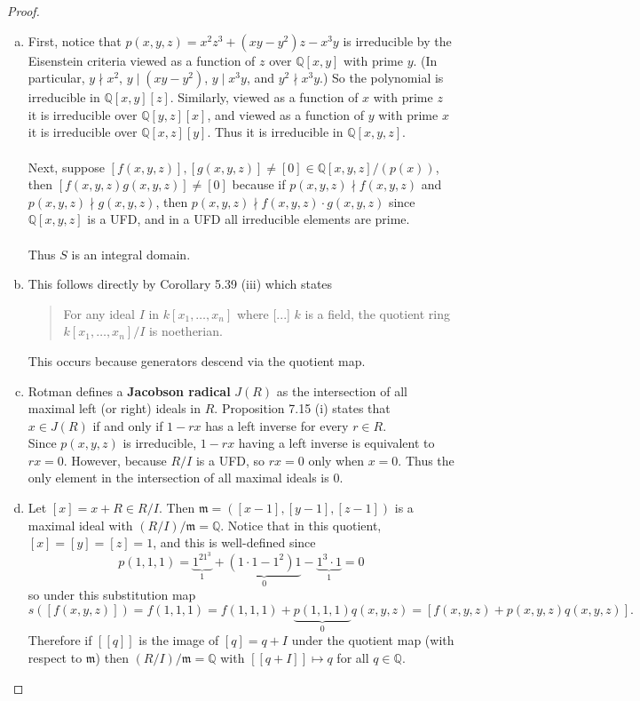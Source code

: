 \documentclass{article}
\begin{document}
\begin{proof} ~
  \begin{enumerate}[(a)]
    \item First, notice that $p(x,y,z) = x^2z^3 + (xy - y^2)z - x^3y$ is
    irreducible by the Eisenstein criteria viewed as a function of $z$ over
    $\mathbb Q[x,y]$ with prime $y$. (In particular, $y \nmid x^2$,
    $y \mid (xy - y^2)$, $y \mid x^3y$, and $y^2 \nmid x^3y$.) So the polynomial is
    irreducible in $\mathbb Q[x,y][z]$.
    Similarly, viewed as a function of $x$ with prime $z$ it is irreducible
    over $\mathbb Q[y,z][x]$, and viewed as a function of $y$ with prime $x$ it
    is irreducible over $\mathbb Q[x,z][y]$.
    Thus it is irreducible in $\mathbb Q[x,y,z]$.
    \\~\\
    Next, suppose $[f(x,y,z)], [g(x,y,z)] \neq [0] \in \mathbb Q[x,y,z]/(p(x))$, then
    $[f(x,y,z)g(x,y,z)] \neq [0]$ because if $p(x,y,z) \nmid f(x,y,z)$ and
    $p(x,y,z) \nmid g(x,y,z)$, then $p(x,y,z) \nmid f(x,y,z)\cdot g(x,y,z)$
    since $\mathbb Q[x,y,z]$ is a UFD, and in a UFD all irreducible elements are prime.
    \\~\\
    Thus $S$ is an integral domain.
    \item This follows directly by Corollary 5.39 (iii) which states
      \begin{quote}
        For any ideal $I$ in $k[x_1, \hdots, x_n]$ where [...] $k$ is a field,
        the quotient ring $k[x_1, \hdots, x_n]/I$ is noetherian.
      \end{quote}
    This occurs because generators descend via the quotient map.
    \item Rotman defines a \textbf{Jacobson radical} $J(R)$ as the intersection
    of all maximal left (or right) ideals in $R$. Proposition 7.15 (i) states
    that $x \in J(R)$ if and only if $1 - rx$ has a left inverse for every
    $r \in R$.
    \\
    Since $p(x,y,z)$ is irreducible, $1 - rx$ having a left inverse is
    equivalent to $rx = 0$. However, because $R/I$ is a UFD, so $rx = 0$ only
    when $x = 0$. Thus the only element in the intersection of all maximal
    ideals is $0$.
    \item Let $[x] = x + R \in R/I$. Then $
      \mathfrak m = ([x - 1], [y - 1], [z - 1])
    $ is a maximal ideal with $(R/I)/\mathfrak m = \mathbb Q$.
    Notice that in this quotient, $[x] = [y] = [z] = 1$,
    and this is well-defined since \[
      p(1,1,1) =
      \underbrace{1^21^3}_1
      + \underbrace{(1\cdot 1 - 1^2)1}_0
      - \underbrace{1^3\cdot1}_1 = 0
    \] so under this substitution map \[
      s([f(x,y,z)])
      = f(1,1,1)
      = f(1,1,1) + \underbrace{p(1,1,1)}_0 q(x,y,z)
      = [f(x,y,z) + p(x,y,z)q(x,y,z)].
    \]
    Therefore if $[[q]]$ is the image of $[q] = q + I$ under the quotient map
    (with respect to $\mathfrak m$)
    then $(R/I)/\mathfrak m = \mathbb Q$ with $[[q + I]] \mapsto q$ for all $q \in \mathbb Q$.
\end{enumerate}
\end{proof}
\end{document}
